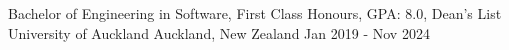 
\begin{cventries}
  \cventry
    {Bachelor of Engineering in Software, First Class Honours, GPA: 8.0, Dean's List} %
    {University of Auckland} %
    {Auckland, New Zealand} %
    {Jan 2019 - Nov 2024} %
    \item{}
    \vspace{-15mm}

\end{cventries}